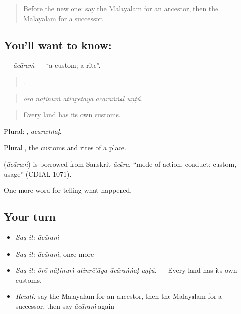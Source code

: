 \label{lesson:ML-C395-acaram}



\begin{quote}
Before the new one: say the Malayalam for an ancestor, then the Malayalam for a successor.
\end{quote}

\subsection*{You'll want to know: }
\textbf{} — \emph{ācāraṁ} — \textquotedblleft{}a custom; a rite\textquotedblright{}.

\begin{quote}
    .
\end{quote}

\begin{quote}
\emph{ōrō nāṭinuṁ atinṟētāya ācāraṅṅaḷ uṇṭŭ.}
\end{quote}

\begin{quote}
Every land has its own customs.
\end{quote}

Plural: , \emph{ācāraṅṅaḷ}.

Plural , the customs and rites of a place.

\begin{cousinweb}
\textbf{} (\emph{ācāraṁ}) is borrowed from Sanskrit \emph{ācāra}, \textquotedblleft{}mode of action, conduct; custom, usage\textquotedblright{} (CDIAL 1071).
\end{cousinweb}

\begin{grammarlens}[title={What you've built}]
One more word for telling what happened.
\end{grammarlens}

\subsection*{Your turn}
\begin{itemize}
\raggedright
  \item \emph{Say it:} \emph{ācāraṁ}
  \item \emph{Say it:} \emph{ācāraṁ}, once more
  \item \emph{Say it:} \emph{ōrō nāṭinuṁ atinṟētāya ācāraṅṅaḷ uṇṭŭ.} — Every land has its own customs.
  \item \emph{Recall:} say the Malayalam for an ancestor, then the Malayalam for a successor, then say \emph{ācāraṁ} again
\end{itemize}

